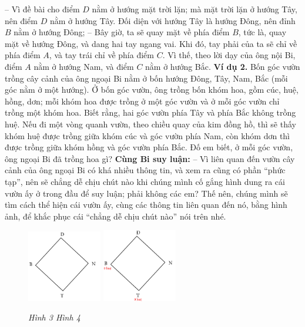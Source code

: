 	\vskip 0.1cm
	-- Vì đề bài cho điểm $D$ nằm ở hướng mặt trời lặn; mà mặt trời lặn ở hướng Tây, nên điểm $D$ nằm ở hướng Tây. Đối diện với hướng Tây là hướng Đông, nên đỉnh $B$ nằm ở hướng Đông;
	\vskip 0.1cm
	-- Bây giờ, ta sẽ quay mặt về phía điểm $B$, tức là, quay mặt về hướng Đông, và dang hai tay ngang vai. Khi đó, tay phải của ta sẽ chỉ về phía điểm $A$, và tay trái chỉ về phía điểm $C$. Vì thế, theo lời dạy của ông nội Bi, điểm $A$ nằm ở hướng Nam, và điểm $C$ nằm ở hướng Bắc.
	\vskip 0.1cm
	\textbf{Ví dụ 2.} Bốn góc vườn trồng cây cảnh của ông ngoại Bi nằm ở bốn hướng Đông, Tây, Nam, Bắc (mỗi góc nằm ở một hướng). Ở bốn góc vườn, ông trồng bốn khóm hoa, gồm cúc, huệ, hồng, dơn; mỗi khóm hoa được trồng ở một góc vườn và ở mỗi góc vườn chỉ trồng một khóm hoa. Biết rằng, hai góc vườn phía Tây và phía Bắc không trồng huệ. Nếu đi một vòng quanh vườn, theo chiều quay của kim đồng hồ, thì sẽ thấy khóm huệ được trồng giữa khóm cúc và góc vườn phía Nam, còn khóm dơn thì được trồng giữa khóm hồng và góc vườn phía Bắc. Đố em biết, ở mỗi góc vườn, ông ngoại Bi đã trồng hoa gì?
	\vskip 0.1cm
	\textbf{Cùng Bi suy luận:}
	\vskip 0.1cm
	-- Vì liên quan đến vườn cây cảnh của ông ngoại Bi có khá nhiều thông tin, và xem ra cũng có phần “phức tạp”, nên sẽ chẳng dễ chịu chút nào khi chúng mình cố gắng hình dung ra cái vườn ấy ở trong đầu để suy luận; phải không các em? Thế nên, chúng mình sẽ tìm cách thể hiện cái vườn ấy, cùng các thông tin liên quan đến nó, bằng hình ảnh, để khắc phục cái “chẳng dễ chịu chút nào” nói trên nhé.
	\vskip 0.1cm
	\begin{figure}
		\vspace*{-15pt}
		\centering
		\captionsetup{labelformat=empty, justification=centering}
		\includegraphics[width= 0.29\textwidth]{pic3}
		\includegraphics[width=0.29\textwidth]{pic4}
		\caption{\small\textit{Hình 3 \hspace*{50pt}Hình 4}}
		\vspace*{-15pt}
	\end{figure}
